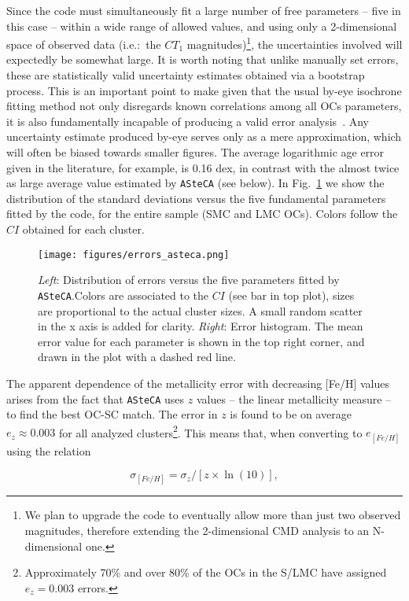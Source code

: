 \documentclass{aa}
\begin{document}
Since the code must simultaneously fit a large number of free parameters --
five in this case -- within a wide range of allowed values, and using only a
2-dimensional space of observed data (i.e.:\ the $CT_1$
magnitudes)\footnote{We plan to upgrade the code to eventually allow
more than just two observed magnitudes, therefore extending the 2-dimensional
CMD analysis to an N-dimensional one.}, the uncertainties involved will
expectedly be somewhat large.
%
It is worth noting that unlike manually set errors, these are
statistically valid uncertainty estimates obtained via a bootstrap process.
This is an important point to make given that the usual by-eye isochrone fitting
method not only disregards known correlations among all OCs parameters,
it is also fundamentally incapable of producing a valid error
analysis~\citep{Naylor_2006}. Any uncertainty estimate produced by-eye serves
only as a mere approximation, which will often be biased towards smaller
figures. The average logarithmic age error given in the literature, for example,
is 0.16 dex, in contrast with the almost twice as large average value estimated
by \texttt{ASteCA} (see below).
%
In Fig.~\ref{fig:errors} we show the distribution of the standard deviations
versus the five fundamental parameters fitted by the code, for the entire sample
(SMC and LMC OCs). Colors follow the $CI$ obtained for each cluster.

\begin{figure}[h!]
\centering
\texttt{[image: figures/errors\_asteca.png]}
\caption{\emph{Left}: Distribution of errors versus the five parameters fitted
by \texttt{ASteCA}.\@ Colors are associated to the $CI$ (see bar in top plot),
sizes are proportional to the actual cluster sizes. A small random scatter in
the x axis is added for clarity.
\emph{Right}: Error histogram. The mean error value for each parameter is shown
in the top right corner, and drawn in the plot with a dashed red line.}
\label{fig:errors}
\end{figure}

The apparent dependence of the metallicity error with decreasing [Fe/H] values
arises from the fact that \texttt{ASteCA} uses $z$ values -- the linear
metallicity measure -- to find the best OC-SC match. The error in $z$ is found
to be on average $e_z{\approx}0.003$ for all analyzed clusters\footnote
{Approximately 70\% and over 80\% of the OCs in the S/LMC have assigned $e_z
{=}0.003$ errors.}. This means that, when converting to $e_{[Fe/H]}$ using the
relation

\begin{equation}
\sigma_{[Fe/H]} = \sigma_z/[z\times\ln(10)],
\end{equation}
\end{document}
